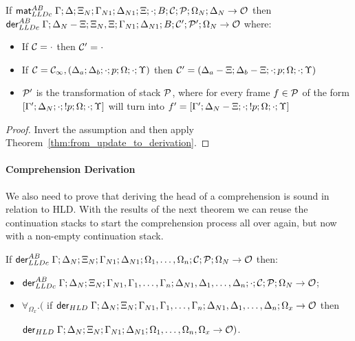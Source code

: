 \begin{corollary}\label{thm:match_to_derivation}
If $\mathsf{mat}_{LLDc}^{AB} \; \Gamma; \Delta; \Xi_N; \Gamma_{N1}; \Delta_{N1}; \Xi; \cdot; B;
\mathcal{C}; \mathcal{P};
\Omega_N; \Delta_N \rightarrow \mathcal{O}$ then\\
$\mathsf{der}_{LLDc}^{AB} \; \Gamma; \Delta_N - \Xi; \Xi_N, \Xi; \Gamma_{N1}; \Delta_{N1}; B; \mathcal{C'};
\mathcal{P'}; \Omega_N \rightarrow \mathcal{O}$ where:
   
\begin{itemize}[leftmargin=*]
   \item If $\mathcal{C} = \cdot$ then $\mathcal{C'} = \cdot$
   \item If $\mathcal{C} = \mathcal{C_1}, (\Delta_a; \Delta_b; \cdot; p; \Omega;
         \cdot; \Upsilon)$ then $\mathcal{C'} = (\Delta_a - \Xi; \Delta_b - \Xi; \cdot; p;
            \Omega; \cdot; \Upsilon)$
   \item $\mathcal{P'}$ is the transformation of stack $\mathcal{P}$, where for every frame $f \in
   \mathcal{P}$ of the form $[\Gamma'; \Delta_N; \cdot; {!} p; \Omega; \cdot; \Upsilon]$
   will turn into $f' = [\Gamma';\Delta_N-\Xi;\cdot;{!} p;\Omega;\cdot;\Upsilon]$
\end{itemize}
\end{corollary}

\begin{proof}
Invert the assumption and then apply Theorem~\ref{thm:from_update_to_derivation}.
\end{proof}


\paragraph{Comprehension Derivation}

We also need to prove that deriving the head of a comprehension is sound in
relation to HLD.  With the results of the next theorem we can reuse the
continuation stacks to start the comprehension process all over again, but now
with a non-empty continuation stack.

\begin{theorem}\label{thm:comprehension_derivation}
If $\mathsf{der}_{LLDc}^{AB} \; \Gamma; \Delta_N; \Xi_N; \Gamma_{N1}; \Delta_{N1}; \Omega_1, \dotsc,
   \Omega_n; \mathcal{C}; \mathcal{P}; \Omega_N \rightarrow \mathcal{O}$ then:

\begin{itemize}[leftmargin=*]
   \item $\mathsf{der}_{LLDc}^{AB} \; \Gamma; \Delta_N; \Xi_N; \Gamma_{N1}, \Gamma_1, \dotsc, \Gamma_n; \Delta_{N1},
   \Delta_1, \dotsc, \Delta_n; \cdot; \mathcal{C}; \mathcal{P}; \Omega_N \rightarrow
   \mathcal{O}$;

   \item $\forall_{\Omega_x}.($ if $\mathsf{der}_{HLD} \; \Gamma; \Delta_N; \Xi_N;
   \Gamma_{N1}, \Gamma_1, \dotsc, \Gamma_n; \Delta_{N1}, \Delta_1, \dotsc,
   \Delta_n; \Omega_x \rightarrow \mathcal{O}$ then

   $\mathsf{der}_{HLD} \; \Gamma; \Delta_N; \Xi_N; \Gamma_{N1}; \Delta_{N1}; \Omega_1, \dotsc,
   \Omega_n, \Omega_x \rightarrow \mathcal{O})$.

\end{itemize}
\end{theorem}

